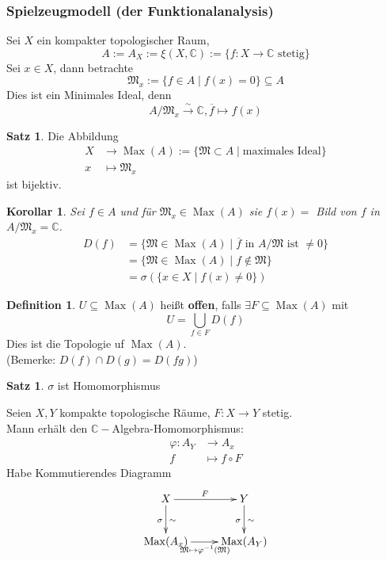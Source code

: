 \documentclass[10pt,a4paper]{article}
\newcommand{\C}{\ensuremath{\mathbb{C}}}
\newcommand{\ol}[1]{\overline{#1}}
\newcommand{\inj}{\xrightarrow{\sim}}
\newcounter{thm}[section]
\let\oldsubsubsection\subsubsection
\renewcommand{\subsubsection}{\stepcounter{thm}\oldsubsubsection}
\theoremstyle{definition}
\newtheorem{definition}[thm]{Definition}
\newtheorem{satz}[thm]{Satz}
\theoremstyle{plain}
\newtheorem{kor}[thm]{Korollar}
\theoremstyle{remark}
\begin{document}
\subsubsection{Spielzeugmodell (der Funktionalanalysis)}
Sei $X$ ein kompakter topologischer Raum,
\[A:=A_X:=\xi (X,\C):=\{f:X\to \C\text{ stetig}\}\]
Sei $x\in X$, dann betrachte
\[\mathfrak M_x:=\{f\in A\mid f(x)=0\}\subseteq A\]
Dies ist ein Minimales Ideal, denn
\[A/\mathfrak M_x\inj \C, \ol{f}\mapsto f(x)\]
\begin{satz}
	Die Abbildung 
\begin{align*}
	X&\rightarrow \operatorname{Max}(A):=\{\mathfrak M\subset A\mid \text{maximales Ideal}\}\\
	x&\mapsto\mathfrak M_x
\end{align*}
	ist bijektiv.
\end{satz}
\begin{kor}
	Sei $f\in A$ und für $\mathfrak M_x\in\operatorname{Max}(A)$ sie $f(x)=$ Bild von $f$ in $A/\mathfrak M_x=\C$.
	\begin{align*}
	D(f)&=\{\mathfrak M\in \operatorname{Max}(A)\mid \text{$\ol{f}$ in $A/\mathfrak M$ ist $\neq 0$}\}\\
	&=\{\mathfrak M\in\operatorname{Max}(A)\mid f\notin\mathfrak M\}\\
	&=\sigma(\{x\in X\mid f(x)\neq 0\})
	\end{align*}
\end{kor}
\begin{definition}
	$U\subseteq\operatorname{Max}(A)$ heißt \textbf{offen}, falls $\exists F\subseteq\operatorname{Max}(A)$ mit
	\[U=\bigcup_{f\in F}D(f)\]
	Dies ist die Topologie uf $\operatorname{Max}(A)$.\\
	(Bemerke: $D(f)\cap D(g)=D(fg)$)
\end{definition}
\begin{satz}
	$\sigma$ ist Homomorphismus
\end{satz}
Seien $X,Y$ kompakte topologische Räume, $F:X\rightarrow Y$ stetig.\\
Mann erhält den $\C-$Algebra-Homomorphismus:
\begin{align*}
\varphi:A_Y&\rightarrow A_x\\
f&\mapsto f\circ F
\end{align*}
Habe Kommutierendes Diagramm
\[\xymatrix{
	X\ar[r]^F\ar[d]_\sigma^\sim& Y\ar[d]_\sigma^\sim\\
	\operatorname{Max}(A_x)\ar[r]_{\vspace{0.5cm} \mathfrak M\mapsto\varphi^{-1}(\mathfrak M)}&\operatorname{Max}(A_Y)
	}\]
\end{document}
